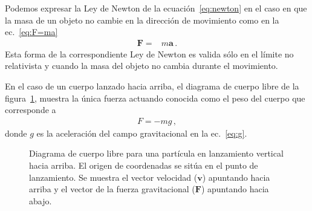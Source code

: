\documentclass[11pt,a4paper]{book}
\begin{document}

Podemos expresar la Ley de Newton de la ecuación~\eqref{eq:newton} en el caso en que la masa de un objeto no cambie en la dirección de movimiento como en la ec.~\eqref{eq:F=ma}
\begin{align}
     \boldsymbol{F}=&m\boldsymbol{a}\,.
\end{align}
Esta forma de la correspondiente Ley de Newton es valida sólo en el límite no relativista y cuando la masa del objeto no cambia durante el movimiento.

En el caso de un cuerpo lanzado hacia arriba, el diagrama de cuerpo libre de la figura~\ref{fig:lanzamiento_vertical}, muestra la única fuerza actuando conocida como el peso del cuerpo que corresponde a
\begin{align}
\label{eq:gravitationalconstantforce}
    F=-mg\,,
\end{align}
donde $g$ es la aceleración del campo gravitacional en la ec.~\eqref{eq:g}.



\begin{figure}[h!] %
    \centering %
    \caption{Diagrama de cuerpo libre para una partícula en lanzamiento vertical hacia arriba. El origen de coordenadas se sitúa en el punto de lanzamiento. Se muestra el vector velocidad ($\boldsymbol{v}$) apuntando hacia arriba y el vector de la fuerza gravitacional ($\boldsymbol{F}$) apuntando hacia abajo.}
    \label{fig:lanzamiento_vertical}
\end{figure}
\end{document}
